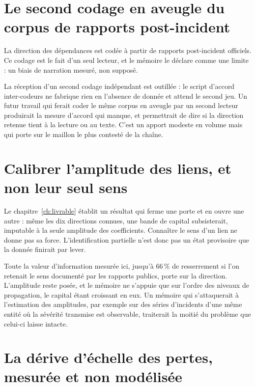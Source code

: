 
\section{Le second codage en aveugle du corpus de rapports post-incident}

La direction des dépendances est codée à partir de rapports post-incident officiels. Ce codage est
le fait d'un seul lecteur, et le mémoire le déclare comme une limite : un biais de narration
mesuré, non supposé.

La réception d'un second codage indépendant est outillée : le script d'accord inter-codeurs ne
fabrique rien en l'absence de donnée et attend le second jeu. Un futur travail qui ferait coder le
même corpus en aveugle par un second lecteur produirait la mesure d'accord qui manque, et
permettrait de dire si la direction retenue tient à la lecture ou au texte. C'est un apport modeste
en volume mais qui porte sur le maillon le plus contesté de la chaîne.

\section{Calibrer l'amplitude des liens, et non leur seul sens}

Le chapitre~\ref{ch:livrable} établit un résultat qui ferme une porte et en ouvre une autre : même
les dix directions connues, une bande de capital subsisterait, imputable à la seule amplitude des
coefficients. Connaître le sens d'un lien ne donne pas sa force. L'identification partielle n'est
donc pas un état provisoire que la donnée finirait par lever.

Toute la valeur d'information mesurée ici, jusqu'à $66\,\%$ de resserrement si l'on retenait le
sens documenté par les rapports publics, porte sur la direction. L'amplitude reste posée, et le mémoire
ne s'appuie que sur l'ordre des niveaux de propagation, le capital étant croissant en eux. Un
mémoire qui s'attaquerait à l'estimation des amplitudes, par exemple sur des séries d'incidents
d'une même entité où la sévérité transmise est observable, traiterait la moitié du problème que
celui-ci laisse intacte.


\section{La dérive d'échelle des pertes, mesurée et non modélisée}


